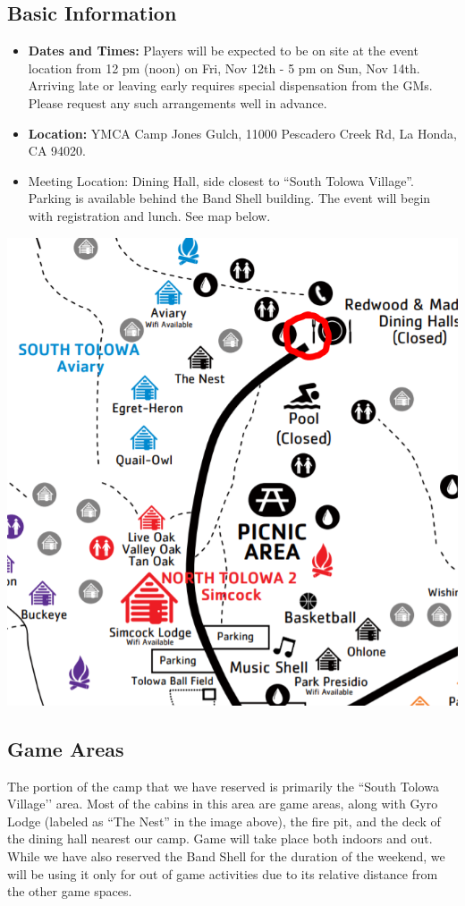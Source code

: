 \documentclass[sheet]{GL2020}
\begin{document}
\subsection{Basic Information}
\begin{itemize}
  \item \textbf{Dates and Times:} Players will be expected to be on site at the event location from 12 pm (noon) on Fri, Nov 12th - 5 pm on Sun, Nov 14th. Arriving late or leaving early requires special dispensation from the GMs. Please request any such arrangements well in advance.
  \item \textbf{Location:} YMCA Camp Jones Gulch, 11000 Pescadero Creek Rd, La Honda, CA 94020.
  \item Meeting Location: Dining Hall, side closest to ``South Tolowa Village''. Parking is available behind the Band Shell building. The event will begin with registration and lunch. See map below.
\end{itemize}

\begin{center}
\includegraphics[scale=0.5]{CampMap}
\end{center}

\subsection{Game Areas}
The portion of the camp that we have reserved is primarily the ``South Tolowa Village’’ area. Most of the cabins in this area are game areas, along with Gyro Lodge (labeled as ``The Nest'' in the image above), the fire pit, and the deck of the dining hall nearest our camp. Game will take place both indoors and out. While we have also reserved the Band Shell for the duration of the weekend, we will be using it only for out of game activities due to its relative distance from the other game spaces.
\end{document}
